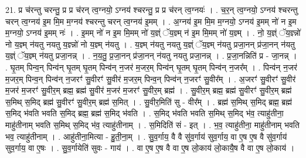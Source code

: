\documentclass[17pt]{extarticle}
\begin{document}
21. प्र च॑रन्तु चरन्तु॒ प्र प्र च॑रन् त्व॒ग्नयो॒ ऽग्नय॑ श्चरन्तु॒ प्र प्र च॑रन् त्व॒ग्नयः॑ । . च॒र॒न् त्व॒ग्नयो॒ ऽग्नय॑ श्चरन्तु चरन् त्व॒ग्नय॑ इ॒म मि॒म म॒ग्नय॑ श्चरन्तु चरन् त्व॒ग्नय॑ इ॒मम् । . अ॒ग्नय॑ इ॒म मि॒म म॒ग्नयो॒ ऽग्नय॑ इ॒मम् नो॑ न इ॒म म॒ग्नयो॒ ऽग्नय॑ इ॒मम् नः॑ । . इ॒मम् नो॑ न इ॒म मि॒मम् नो॑ य॒ज्ञ्ं ॅय॒ज्ञ्म् न॑ इ॒म मि॒मम् नो॑ य॒ज्ञ्म् । . नो॒ य॒ज्ञ्ं ॅय॒ज्ञ्न्नो॑ नो य॒ज्ञ्म् न॑यतु नयतु य॒ज्ञ्न्नो॑ नो य॒ज्ञ्म् न॑यतु । . य॒ज्ञ्म् न॑यतु नयतु य॒ज्ञ्ं ॅय॒ज्ञ्म् न॑यतु प्रजा॒नन् प्र॑जा॒नन् न॑यतु य॒ज्ञ्ं ॅय॒ज्ञ्म् न॑यतु प्रजा॒नन्न् । . न॒य॒तु॒ प्र॒जा॒नन् प्र॑जा॒नन् न॑यतु नयतु प्रजा॒नन्न् । . प्र॒जा॒नन्निति॑ प्र - जा॒नन्न् । . घृ॒तम् पिन्व॒न् पिन्व॑न् घृ॒तम् घृ॒तम् पिन्व॑न् न॒जर॑ म॒जर॒म् पिन्व॑न् घृ॒तम् घृ॒तम् पिन्व॑न् न॒जर᳚म् । . पिन्व॑न् न॒जर॑ म॒जर॒म् पिन्व॒न् पिन्व॑न् न॒जरꣳ॑ सु॒वीरꣳ॑ सु॒वीर॑ म॒जर॒म् पिन्व॒न् पिन्व॑न् न॒जरꣳ॑ सु॒वीर᳚म् । . अ॒जरꣳ॑ सु॒वीरꣳ॑ सु॒वीर॑ म॒जर॑ म॒जरꣳ॑ सु॒वीर॒म् ब्रह्म॒ ब्रह्म॑ सु॒वीर॑ म॒जर॑ म॒जरꣳ॑ सु॒वीर॒म् ब्रह्म॑ । . सु॒वीर॒म् ब्रह्म॒ ब्रह्म॑ सु॒वीरꣳ॑ सु॒वीर॒म् ब्रह्म॑ स॒मिथ् स॒मिद् ब्रह्म॑ सु॒वीरꣳ॑ सु॒वीर॒म् ब्रह्म॑ स॒मित् । . सु॒वीर॒मिति॑ सु - वीर᳚म् । . ब्रह्म॑ स॒मिथ् स॒मिद् ब्रह्म॒ ब्रह्म॑ स॒मिद् भ॑वति भवति स॒मिद् ब्रह्म॒ ब्रह्म॑ स॒मिद् भ॑वति । . स॒मिद् भ॑वति भवति स॒मिथ् स॒मिद् भ॑व॒ त्याहु॑तीना॒ माहु॑तीनाम् भवति स॒मिथ् स॒मिद् भ॑व॒ त्याहु॑तीनाम् । . स॒मिदिति॑ सं - इत् । . भ॒व॒ त्याहु॑तीना॒ माहु॑तीनाम् भवति भव॒ त्याहु॑तीनाम् । . आहु॑तीना॒मित्या - हु॒ती॒ना॒म् । . सु॒व॒र्गाय॒ वै वै सु॑व॒र्गाय॑ सुव॒र्गाय॒ वा ए॒ष ए॒ष वै सु॑व॒र्गाय॑ सुव॒र्गाय॒ वा ए॒षः । . सु॒व॒र्गायेति॑ सुवः - गाय॑ । . वा ए॒ष ए॒ष वै वा ए॒ष लो॒काय॑ लो॒कायै॒ष वै वा ए॒ष लो॒काय॑ । \newline
\end{document}
